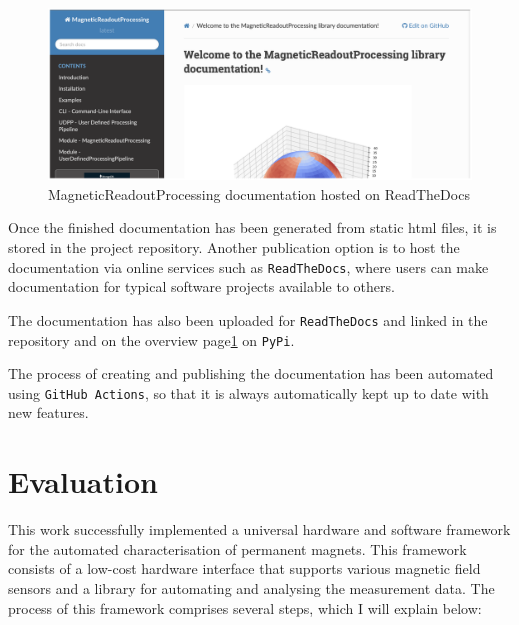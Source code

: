\begin{figure}
\centering
\includegraphics{./generated_images/border_MagneticReadoutProcessing_documentation_hosted_on_ReadTheDocs.png}
\caption{MagneticReadoutProcessing documentation hosted on ReadTheDocs
\label{MagneticReadoutProcessing_documentation_hosted_on_ReadTheDocs.png}}
\end{figure}

Once the finished documentation has been generated from static
\gls{html} files, it is stored in the project repository. Another
publication option is to host the documentation via online services such
as \passthrough{\lstinline!ReadTheDocs!}\cite{ReadTheDocs}, where
users can make documentation for typical software projects available to
others.

The documentation has also been uploaded for
\passthrough{\lstinline!ReadTheDocs!}\cite{MagneticReadoutProcessingReadTheDocs}
and linked in the repository and on the overview
page\ref{MagneticReadoutProcessing_documentation_hosted_on_ReadTheDocs.png}
on \passthrough{\lstinline!PyPi!}.

The process of creating and publishing the documentation has been
automated using
\passthrough{\lstinline!GitHub Actions!}\cite{GithubActions}, so
that it is always automatically kept up to date with new features.

\hypertarget{evaluation}{%
\chapter{Evaluation}\label{evaluation}}

This work successfully implemented a universal hardware and software
framework for the automated characterisation of permanent magnets. This
framework consists of a low-cost hardware interface that supports
various magnetic field sensors and a library for automating and
analysing the measurement data. The process of this framework comprises
several steps, which I will explain below:

